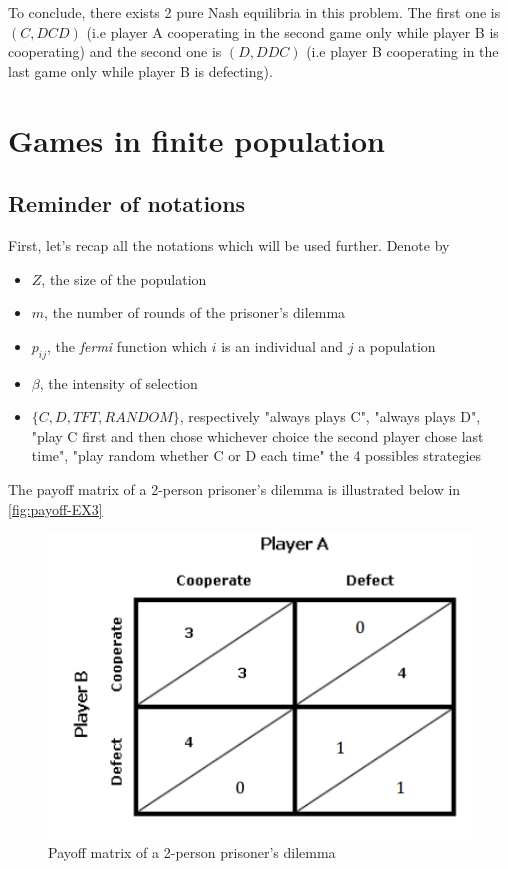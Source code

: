 \documentclass{article}
\begin{document}
To conclude, there exists 2 pure Nash equilibria in this problem. The first one is $(C, DCD)$ (i.e player A cooperating in the second game only while player B is cooperating) and the second one is $(D, DDC)$ (i.e player B cooperating in the last game only while player B is defecting). 

\section{Games in finite population}

\subsection*{Reminder of notations}
First, let's recap all the notations which will be used further. Denote by 
\begin{itemize}
\item $Z$, the size of the population
\item $m$, the number of rounds of the prisoner's dilemma 
\item $p_{ij}$, the \textit{fermi} function which $i$ is an individual and $j$ a population
\item $\beta$, the intensity of selection
\item $\{C,D,TFT,RANDOM\}$, respectively "always plays C", "always plays D", "play C first and then chose whichever choice the second player chose last time", "play random whether C or D each time" the 4 possibles strategies
\end{itemize}

The payoff matrix of a 2-person prisoner's dilemma is illustrated below in \autoref{fig:payoff-EX3} 

\begin{figure}[h]
  \centering
  \includegraphics[scale=0.5]{figures/payoff-EX3.png}
  \caption{Payoff matrix of a 2-person prisoner's dilemma}
  \label{fig:payoff-EX3}
\end{figure}
\end{document}
